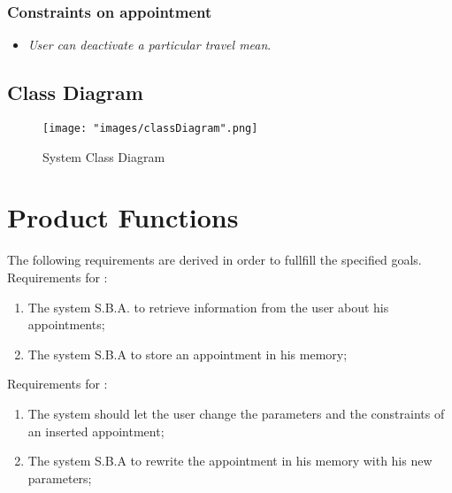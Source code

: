 \subsubsection{Constraints on appointment} \label{subsubsect:constronappoint}
\begin{itemize}
\item \textit{User can deactivate a particular travel mean}.
\end{itemize}

\subsection{Class Diagram}
\begin{figure}[H]
\begin{center}
\texttt{[image: "images/classDiagram".png]}
\caption{System Class Diagram}
\end{center}
\end{figure}

\section{Product Functions}

The following requirements are derived in order to fullfill the specified goals.\\


Requirements for :
\begin{enumerate}
\renewcommand\labelenumi{\textbf{R\theenumi}}
\item The system S.B.A. to retrieve information from the user about his appointments; \label{req:R1}
\item The system S.B.A to store an appointment in his memory;
\end{enumerate}

Requirements for :
\begin{enumerate}[resume]
\renewcommand\labelenumi{\textbf{R\theenumi}}
\item The system should let the user change the parameters and the constraints of an inserted appointment; 
\item The system S.B.A to rewrite the appointment in his memory with his new parameters;
\end{enumerate}

